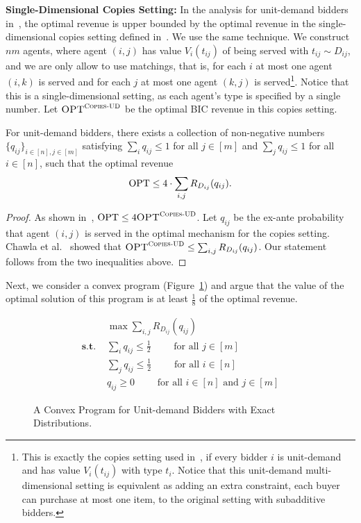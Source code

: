 \vspace{.1in}

\noindent\textbf{Single-Dimensional Copies Setting:} In the analysis for unit-demand bidders in~\cite{ChawlaHMS10, CaiDW16}, the optimal revenue is upper bounded by the optimal revenue in the single-dimensional copies setting defined in~\cite{ChawlaHMS10}. We use the same technique. We construct $nm$ agents, where agent $(i,j)$ has value $V_i(t_{ij})$ of being served with $t_{ij}\sim D_{ij}$, and we are only allow to use matchings, that is, for each $i$ at most one agent $(i,k)$ is served and for each $j$ at most one agent $(k,j)$ is served\footnote{This is exactly the copies setting used in~\cite{ChawlaHMS10}, if every bidder $i$ is unit-demand and has value $V_i(t_{ij})$ with type $t_i$. Notice that this unit-demand multi-dimensional setting is equivalent as adding an extra constraint, each buyer can purchase at most one item, to the original setting with subadditive bidders.}. %
Notice that this is a single-dimensional setting, as each agent's type is specified by a single number. Let $\textsc{OPT}^{\textsc{Copies-UD}}$ be the optimal BIC revenue in this copies setting.


\begin{lemma}\label{lem:UB for UD rev}
For unit-demand bidders, there exists a collection of non-negative numbers $\{q_{ij}\}_{i\in[n], j\in[m]}$ satisfying $\sum_i q_{ij}\leq 1$ for all $j\in [m]$ and $\sum_j q_{ij}\leq 1$ for all $i\in [n]$, such that the optimal revenue $$\text{OPT}\leq 4\cdot \sum_{i,j} R_{D_{ij}}(q_{ij}).$$
\end{lemma}
\begin{proof}
As shown in~\cite{CaiDW16}, $\text{OPT}\leq 4 \textsc{OPT}^{\textsc{Copies-UD}}$. Let $q_{ij}$ be the ex-ante probability that agent $(i,j)$ is served in the optimal mechanism for the copies setting. Chawla et al.~\cite{ChawlaHMS10} showed that $\textsc{OPT}^{\textsc{Copies-UD}}\leq \sum_{i,j} R_{D_{ij}}(q_{ij})$. Our statement follows from the two inequalities above.\end{proof}

Next, we consider a convex program (Figure~\ref{fig:CP unit demand}) and argue that the value of the optimal solution of this program is at least $\frac{1}{8}$ of the optimal revenue.
\begin{figure}[ht]
\begin{minipage}{\textwidth} 
\begin{align*}\label{prog:convex ud}
&\max \sum_{i,j} R_{D_{ij}}(q_{ij})\\
\textbf{s.t. }& \sum_i q_{ij}\leq \frac{1}{2}\qquad \text{ for all $j\in[m]$}\\
& \sum_j q_{ij}\leq \frac{1}{2}\qquad \text{ for all $i\in[n]$}\\
& q_{ij}\geq 0\qquad \text{ for all $i\in[n]$ and $j\in[m]$}
\end{align*}
\end{minipage}
\caption{A Convex Program for Unit-demand Bidders with Exact Distributions.}
\label{fig:CP unit demand}
\end{figure}

